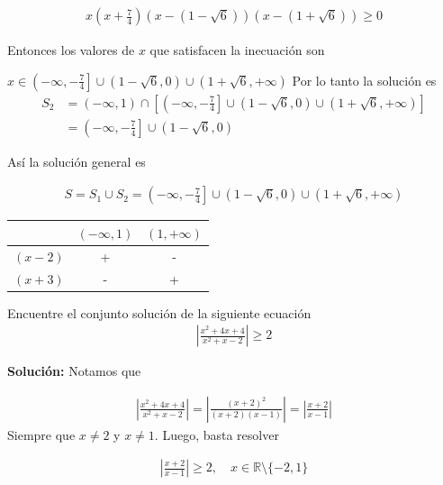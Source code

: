 \documentclass[12pt]{book}
\begin{document}
\begin{itemize}
\begin{align*}
    x\left(x+\frac{7}{4}\right)\left(x-(1-\sqrt{6}) \right)\left(x-(1+\sqrt{6}) \right) \geq 0 
\end{align*}

Entonces los valores de $x$ que satisfacen la inecuación son

$x \in \left(-\infty,-\frac{7}{4} \right]  \cup (1-\sqrt{6},0) \cup (1+\sqrt{6},+\infty)$
Por lo tanto la solución es
\begin{align*}
    S_2&= (-\infty, 1) \cap \left[\left(-\infty,-\frac{7}{4} \right]  \cup (1-\sqrt{6},0) \cup (1+\sqrt{6},+\infty) \right] \\
    &=\left(-\infty,-\frac{7}{4} \right] \cup (1-\sqrt{6},0)
\end{align*}
\end{itemize}
Así la solución general es

\begin{align*}
    S=S_1 \cup S_2 = \left(-\infty,-\frac{7}{4} \right]  \cup (1-\sqrt{6},0) \cup (1+\sqrt{6},+\infty)
\end{align*}

\begin{center}
\begin{tabular}{|c|c|c|}
\hline
   & $(-\infty,1) $  & $(1,+\infty)$  \\
   \hline
   $(x-2)$ & +  & - \\ \hline
   $(x+3)$ & - & + \\ 
   \hline
\end{tabular}
\end{center}

\begin{prob}{}{}
    Encuentre el conjunto solución de la siguiente ecuación 
    \begin{align*}
        \left|\frac{x^2+4x+4}{x^2+x-2}\right| \geq 2
    \end{align*}
\end{prob}
\textbf{Solución:} Notamos que 

\begin{align*}
    \left|\frac{x^2+4x+4}{x^2+x-2} \right|=\left|\frac{(x+2)^2}{(x+2)(x-1)} \right| = \left|\frac{x+2}{x-1} \right|
\end{align*}
Siempre que $x \neq 2$ y $x \neq 1$. Luego, basta resolver 

\begin{align*}
     \left|\frac{x+2}{x-1} \right| \geq 2, \quad x \in \mathbb{R}\setminus\{-2,1\}
\end{align*}
\end{document}
